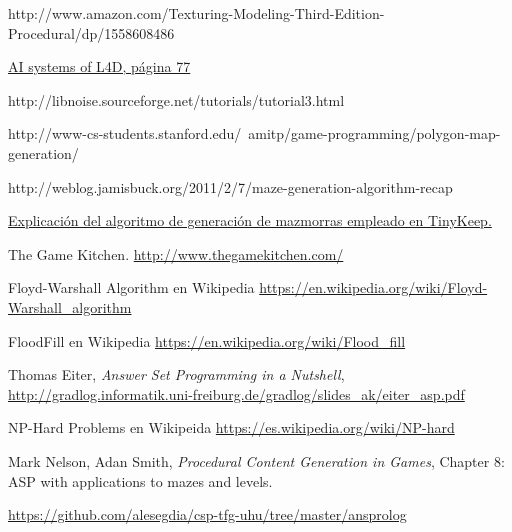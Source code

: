 \begin{thebibliography}{99}
 http://www.amazon.com/Texturing-Modeling-Third-Edition-Procedural/dp/1558608486

 \href{http://www.valvesoftware.com/publications/2009/ai_systems_of_l4d_mike_booth.pdf}{AI systems of L4D, página 77}

 http://libnoise.sourceforge.net/tutorials/tutorial3.html

 http://www-cs-students.stanford.edu/~amitp/game-programming/polygon-map-generation/

 http://weblog.jamisbuck.org/2011/2/7/maze-generation-algorithm-recap

 \href{http://www.reddit.com/r/gamedev/comments/1dlwc4/procedural_dungeon_generation_algorithm_explained/}{Explicación del algoritmo de generación de mazmorras empleado en TinyKeep.}

 The Game Kitchen. \href{http://www.thegamekitchen.com/}{http://www.thegamekitchen.com/}

 Floyd-Warshall Algorithm en Wikipedia \href{https://en.wikipedia.org/wiki/Floyd-Warshall\_algorithm}{https://en.wikipedia.org/wiki/Floyd-Warshall\_algorithm}

 FloodFill en Wikipedia \href{https://en.wikipedia.org/wiki/Flood\_fill}{https://en.wikipedia.org/wiki/Flood\_fill}

 Thomas Eiter, \emph{Answer Set Programming in a Nutshell}, \href{http://gradlog.informatik.uni-freiburg.de/gradlog/slides\_ak/eiter\_asp.pdf}{http://gradlog.informatik.uni-freiburg.de/gradlog/slides\_ak/eiter\_asp.pdf}

 NP-Hard Problems en Wikipeida \href{https://es.wikipedia.org/wiki/NP-hard}{https://es.wikipedia.org/wiki/NP-hard}

 Mark Nelson, Adan Smith, \emph{Procedural Content Generation in Games}, Chapter 8: ASP with applications to mazes and levels.

 \href{https://github.com/alesegdia/csp-tfg-uhu/tree/master/ansprolog}{https://github.com/alesegdia/csp-tfg-uhu/tree/master/ansprolog}

\end{thebibliography}







